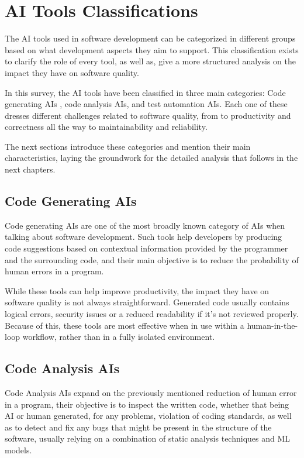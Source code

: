 \chapter{AI Tools Classifications}

The AI tools used in software development can be categorized in different groups based on what development aspects they aim to support. This classification exists to clarify the role of every tool, as well as, give a more structured analysis on the impact they have on software quality.

In this survey, the AI tools have been classified in three main categories: Code generating AIs , code analysis AIs, and test automation AIs. Each one of these dresses different challenges related to software quality, from to productivity and correctness all the way to maintainability and reliability.

The next sections introduce these categories and mention their main characteristics, laying the groundwork for the detailed analysis that follows in the next chapters.

\newpage

\section{Code Generating AIs}

Code generating AIs are one of the most broadly known category of AIs when talking about software development. Such tools help developers by producing code suggestions based on contextual information provided by the programmer and the surrounding code, and their main objective is to reduce the probability of human errors in a program. 

While these tools can help improve productivity, the impact they have on software quality is not always straightforward. Generated code usually contains logical errors, security issues or a reduced readability if it's not reviewed properly. Because of this, these tools are most effective when in use within a human-in-the-loop workflow, rather than in a fully isolated environment.

\section{Code Analysis AIs}

Code Analysis AIs expand on the previously mentioned reduction of human error in a program, their objective is to inspect the written code, whether that being AI or human generated, for any problems, violation of coding standards, as well as to detect and fix any bugs that might be present in the structure of the software, usually relying on a combination of static analysis techniques and ML models.

